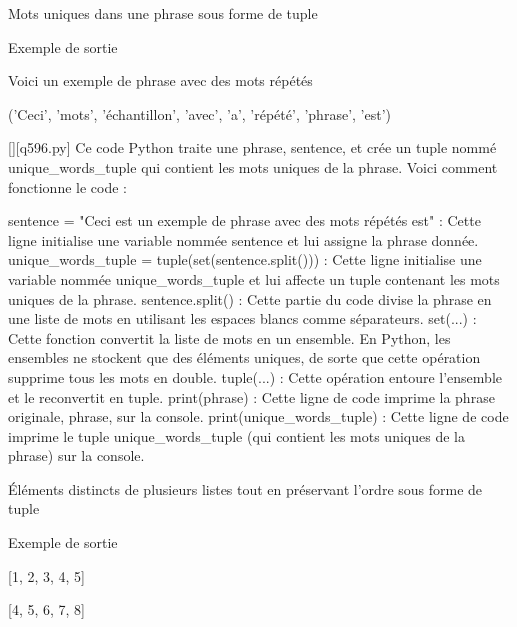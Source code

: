         \question
        Mots uniques dans une phrase sous forme de tuple

Exemple de sortie

Voici un exemple de phrase avec des mots répétés

('Ceci', 'mots', 'échantillon', 'avec', 'a', 'répété', 'phrase', 'est')
        \par
        \begin{solution}
            \renewcommand{\nomfichier}{q596.py}
            \pythonfile{\chemincode \nomfichier}[][\nomfichier]
            Ce code Python traite une phrase, sentence, et crée un tuple nommé unique_words_tuple qui contient les mots uniques de la phrase. Voici comment fonctionne le code :

    sentence = "Ceci est un exemple de phrase avec des mots répétés est" : Cette ligne initialise une variable nommée sentence et lui assigne la phrase donnée.
    unique_words_tuple = tuple(set(sentence.split())) : Cette ligne initialise une variable nommée unique_words_tuple et lui affecte un tuple contenant les mots uniques de la phrase.
        sentence.split() : Cette partie du code divise la phrase en une liste de mots en utilisant les espaces blancs comme séparateurs.
        set(...) : Cette fonction convertit la liste de mots en un ensemble. En Python, les ensembles ne stockent que des éléments uniques, de sorte que cette opération supprime tous les mots en double.
        tuple(...) : Cette opération entoure l'ensemble et le reconvertit en tuple.
    print(phrase) : Cette ligne de code imprime la phrase originale, phrase, sur la console.
    print(unique_words_tuple) : Cette ligne de code imprime le tuple unique_words_tuple (qui contient les mots uniques de la phrase) sur la console.
        \end{solution}
        

        \question
        Éléments distincts de plusieurs listes tout en préservant l'ordre sous forme de tuple

Exemple de sortie

[1, 2, 3, 4, 5]

[4, 5, 6, 7, 8]

